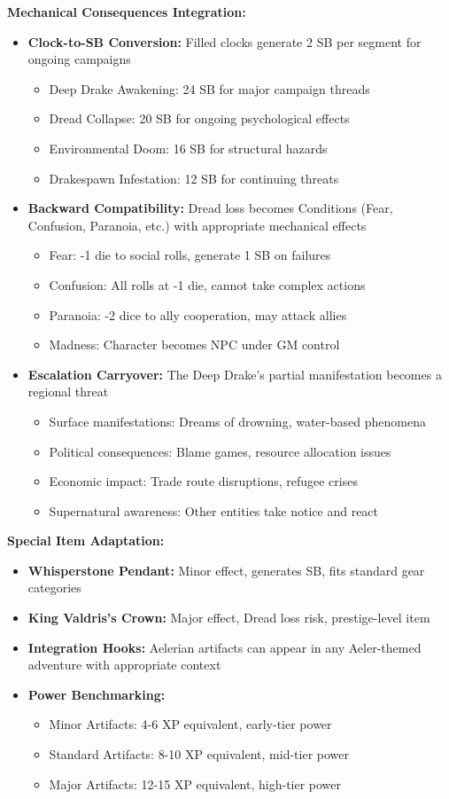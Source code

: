 \documentclass[11pt]{article}
\begin{document}
\textbf{Mechanical Consequences Integration:} \begin{itemize} \item \textbf{Clock-to-SB Conversion:} Filled clocks generate 2 SB per segment for ongoing campaigns \begin{itemize} \item Deep Drake Awakening: 24 SB for major campaign threads \item Dread Collapse: 20 SB for ongoing psychological effects \item Environmental Doom: 16 SB for structural hazards \item Drakespawn Infestation: 12 SB for continuing threats \end{itemize} \item \textbf{Backward Compatibility:} Dread loss becomes Conditions (Fear, Confusion, Paranoia, etc.) with appropriate mechanical effects \begin{itemize} \item Fear: -1 die to social rolls, generate 1 SB on failures \item Confusion: All rolls at -1 die, cannot take complex actions \item Paranoia: -2 dice to ally cooperation, may attack allies \item Madness: Character becomes NPC under GM control \end{itemize} \item \textbf{Escalation Carryover:} The Deep Drake's partial manifestation becomes a regional threat \begin{itemize} \item Surface manifestations: Dreams of drowning, water-based phenomena \item Political consequences: Blame games, resource allocation issues \item Economic impact: Trade route disruptions, refugee crises \item Supernatural awareness: Other entities take notice and react \end{itemize} \end{itemize}

\textbf{Special Item Adaptation:} \begin{itemize} \item \textbf{Whisperstone Pendant:} Minor effect, generates SB, fits standard gear categories \item \textbf{King Valdris's Crown:} Major effect, Dread loss risk, prestige-level item \item \textbf{Integration Hooks:} Aelerian artifacts can appear in any Aeler-themed adventure with appropriate context \item \textbf{Power Benchmarking:} \begin{itemize} \item Minor Artifacts: 4-6 XP equivalent, early-tier power \item Standard Artifacts: 8-10 XP equivalent, mid-tier power \item Major Artifacts: 12-15 XP equivalent, high-tier power \end{itemize} \end{itemize}
\end{document}
